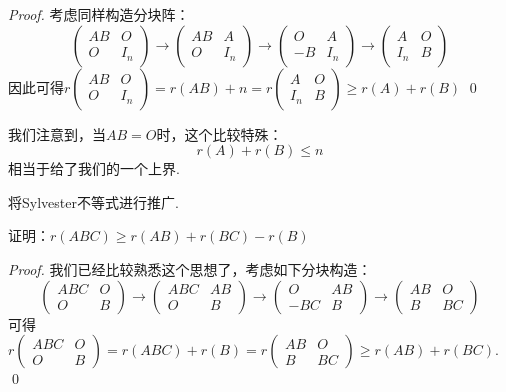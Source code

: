 \begin{proof}
	考虑同样构造分块阵：
	$$
		\begin{pmatrix}
			AB & O \\
			O & I_n 
		\end{pmatrix} \to
		\begin{pmatrix}
			AB & A \\
			O & I_n
		\end{pmatrix} \to
		\begin{pmatrix}
			O & A \\
			-B & I_n
		\end{pmatrix} \to
		\begin{pmatrix}
			A & O \\
			I_n & B
		\end{pmatrix}
	$$
	因此可得$r\begin{pmatrix}
		AB & O \\
		O & I_n 
	\end{pmatrix}=r(AB) + n=r\begin{pmatrix}
		A & O \\
		I_n & B
	\end{pmatrix} \geq r(A) + r(B)$
	\qed
\end{proof}

\begin{remark}
	我们注意到，当$AB=O$时，这个比较特殊：
	$$
		r(A) + r(B) \leq n
	$$
	相当于给了我们的一个上界.
\end{remark}

将Sylvester不等式进行推广.

\begin{proposition}[Frobenius不等式]
	证明：$r(ABC) \geq r(AB) + r(BC) - r(B)$
\end{proposition}

\begin{proof}
	我们已经比较熟悉这个思想了，考虑如下分块构造：
	$$
		\begin{pmatrix}
			ABC & O \\
			O & B
		\end{pmatrix} \to
		\begin{pmatrix}
			ABC & AB \\
			O & B
		\end{pmatrix} \to
		\begin{pmatrix}
			O & AB \\
			-BC & B
		\end{pmatrix} \to
		\begin{pmatrix}
			AB & O \\
			B & BC
		\end{pmatrix}
	$$
	可得$r\begin{pmatrix}
		ABC & O \\
		O & B
	\end{pmatrix}=r(ABC) + r(B) = r\begin{pmatrix}
		AB & O \\
		B & BC
	\end{pmatrix}\geq r(AB)+ r(BC)$.
	\qed
\end{proof}

